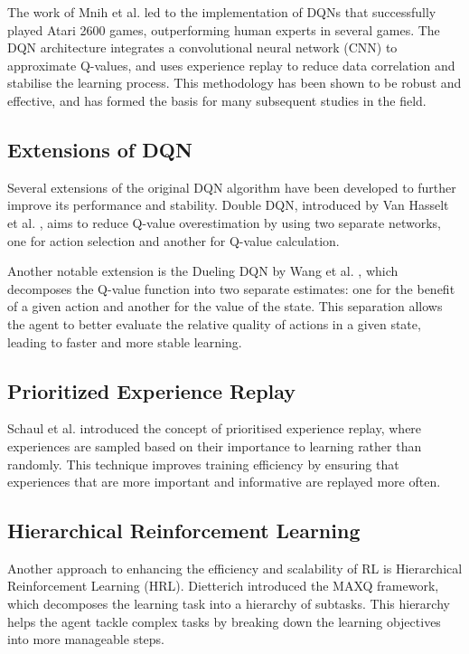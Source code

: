 \documentclass[twocolumn]{webofc}
\begin{document}
The work of Mnih et al. \cite{mnih2013playingatarideepreinforcement} led to the implementation of DQNs that successfully played Atari 2600 games, outperforming human experts in several games. The DQN architecture integrates a convolutional neural network (CNN) to approximate Q-values, and uses experience replay to reduce data correlation and stabilise the learning process. This methodology has been shown to be robust and effective, and has formed the basis for many subsequent studies in the field.

\subsection{Extensions of DQN}
Several extensions of the original DQN algorithm have been developed to further improve its performance and stability. Double DQN, introduced by Van Hasselt et al. \cite{van_Hasselt_Guez_Silver_2016}, aims to reduce Q-value overestimation by using two separate networks, one for action selection and another for Q-value calculation.

Another notable extension is the Dueling DQN by Wang et al. \cite{pmlr-v48-wangf16}, which decomposes the Q-value function into two separate estimates: one for the benefit of a given action and another for the value of the state. This separation allows the agent to better evaluate the relative quality of actions in a given state, leading to faster and more stable learning.

\subsection{Prioritized Experience Replay}
Schaul et al. \cite{schaul2016prioritizedexperiencereplay} introduced the concept of prioritised experience replay, where experiences are sampled based on their importance to learning rather than randomly. This technique improves training efficiency by ensuring that experiences that are more important and informative are replayed more often. 

\subsection{Hierarchical Reinforcement Learning}
Another approach to enhancing the efficiency and scalability of RL is Hierarchical Reinforcement Learning (HRL). Dietterich \cite{dietterich2000hierarchical} introduced the MAXQ framework, which decomposes the learning task into a hierarchy of subtasks. This hierarchy helps the agent tackle complex tasks by breaking down the learning objectives into more manageable steps.
\end{document}
